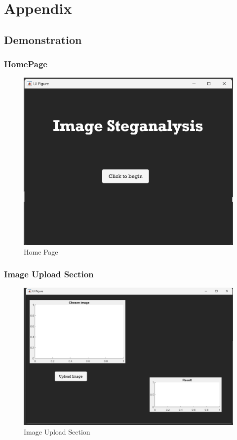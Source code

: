 \chapter*{Appendix}
\renewcommand{\thefigure}{A-\arabic{figure}}
\renewcommand{\thesection}{\Alph{section}}
\section{Demonstration}
\subsection{HomePage}
\begin{figure}[H]
    \vspace{1.5cm}
    \centering
    \includegraphics[width=140mm]{./img/HomePage.png}
    \caption{Home Page}
\end{figure}

\subsection{Image Upload Section}
\begin{figure}[H]
    \centering
    \includegraphics[width=140mm]{./img/choose.png}
    \caption{Image Upload Section}
\end{figure}

